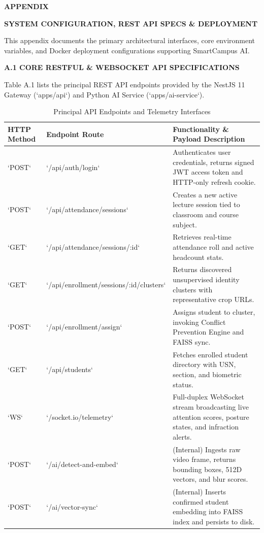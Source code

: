 \newpage
\begin{flushleft}
{\fontsize{16pt}{16pt}\selectfont \textbf{APPENDIX}}
\end{flushleft}		
\begin{center}
{\fontsize{18pt}{22pt}\selectfont \textbf{SYSTEM CONFIGURATION, REST API SPECS \& DEPLOYMENT}}\\[2mm]
\end{center}

\onehalfspacing
\justifying
\noindent This appendix documents the primary architectural interfaces, core environment variables, and Docker deployment configurations supporting SmartCampus AI.

\vspace{0.15in}
\begin{flushleft}
{\fontsize{14pt}{18pt}\selectfont \textbf{A.1 CORE RESTFUL \& WEBSOCKET API SPECIFICATIONS}}\\[2mm]
\end{flushleft}

\noindent Table A.1 lists the principal REST API endpoints provided by the NestJS 11 Gateway (`apps/api`) and Python AI Service (`apps/ai-service`).

\begin{table}[h]
\centering
\caption{Principal API Endpoints and Telemetry Interfaces}
\label{tab:api_specs}
\vspace{2mm}
\begin{tabular}{l l p{8.5cm}}
\toprule
\textbf{HTTP Method} & \textbf{Endpoint Route} & \textbf{Functionality \& Payload Description} \\
\midrule
`POST` & `/api/auth/login` & Authenticates user credentials, returns signed JWT access token and HTTP-only refresh cookie. \\
`POST` & `/api/attendance/sessions` & Creates a new active lecture session tied to classroom and course subject. \\
`GET` & `/api/attendance/sessions/:id` & Retrieves real-time attendance roll and active headcount stats. \\
`GET` & `/api/enrollment/sessions/:id/clusters` & Returns discovered unsupervised identity clusters with representative crop URLs. \\
`POST` & `/api/enrollment/assign` & Assigns student to cluster, invoking Conflict Prevention Engine and FAISS sync. \\
`GET` & `/api/students` & Fetches enrolled student directory with USN, section, and biometric status. \\
`WS` & `/socket.io/telemetry` & Full-duplex WebSocket stream broadcasting live attention scores, posture states, and infraction alerts. \\
`POST` & `/ai/detect-and-embed` & (Internal) Ingests raw video frame, returns bounding boxes, 512D vectors, and blur scores. \\
`POST` & `/ai/vector-sync` & (Internal) Inserts confirmed student embedding into FAISS index and persists to disk. \\
\bottomrule
\end{tabular}
\end{table}

